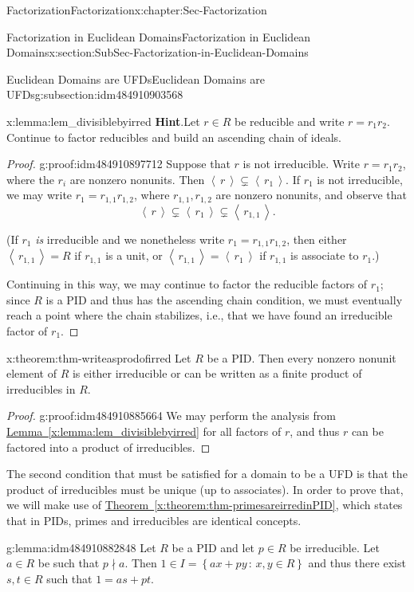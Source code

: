 \documentclass[oneside,10pt,]{book}
\newcommand{\blocktitlefont}{\relax}
\newcommand{\xreffont}{\relax}
\numberwithin{equation}{section}
\newcommand{\ideal}[1]{\left\langle\, #1 \,\right\rangle}
\newcommand{\setof}[2]{{\left\{#1\,\colon\,#2\right\}}}
\begin{document}
\begin{chapterptx}{Factorization}{}{Factorization}{}{}{x:chapter:Sec-Factorization}
\begin{sectionptx}{Factorization in Euclidean Domains}{}{Factorization in Euclidean Domains}{}{}{x:section:SubSec-Factorization-in-Euclidean-Domains}
\begin{subsectionptx}{Euclidean Domains are UFDs}{}{Euclidean Domains are UFDs}{}{}{g:subsection:idm484910903568}
\begin{lemma}{}{}{x:lemma:lem_divisiblebyirred}
\textbf{\blocktitlefont Hint}.\quad{}Let \(r\in R\) be reducible and write \(r = r_1 r_2\). Continue to factor reducibles and build an ascending chain of ideals.%
\end{lemma}
\begin{proof}{}{g:proof:idm484910897712}
Suppose that \(r\) is not irreducible. Write \(r = r_1 r_2\), where the \(r_i\) are nonzero nonunits. Then \(\ideal{r} \subsetneq \ideal{r_1}\). If \(r_1\) is not irreducible, we may write \(r_1 = r_{1,1}r_{1,2}\), where \(r_{1,1},r_{1,2}\) are nonzero nonunits, and observe that%
\begin{equation*}
\ideal{r} \subsetneq \ideal{r_1}\subsetneq \ideal{r_{1,1}}\text{.}
\end{equation*}
%
\par
(If \(r_1\) \emph{is} irreducible and we nonetheless write \(r_1 = r_{1,1} r_{1,2}\), then either \(\ideal{r_{1,1}} = R\) if \(r_{1,1}\) is a unit, or \(\ideal{r_{1,1}} = \ideal{r_1}\) if \(r_{1,1}\) is associate to \(r_1\).)%
\par
Continuing in this way, we may continue to factor the reducible factors of \(r_1\); since \(R\) is a PID and thus has the ascending chain condition, we must eventually reach a point where the chain stabilizes, i.e., that we have found an irreducible factor of \(r_1\).%
\end{proof}
\begin{theorem}{}{}{x:theorem:thm-writeasprodofirred}%
Let \(R\) be a PID. Then every nonzero nonunit element of \(R\) is either irreducible or can be written as a finite product of irreducibles in \(R\).%
\end{theorem}
\begin{proof}{}{g:proof:idm484910885664}
We may perform the analysis from \hyperref[x:lemma:lem_divisiblebyirred]{Lemma~{\xreffont\ref{x:lemma:lem_divisiblebyirred}}} for all factors of \(r\), and thus \(r\) can be factored into a product of irreducibles.%
\end{proof}
The second condition that must be satisfied for a domain to be a UFD is that the product of irreducibles must be unique (up to associates). In order to prove that, we will make use of \hyperref[x:theorem:thm-primesareirredinPID]{Theorem~{\xreffont\ref{x:theorem:thm-primesareirredinPID}}}, which states that in PIDs, primes and irreducibles are identical concepts.%
\begin{lemma}{}{}{g:lemma:idm484910882848}%
Let \(R\) be a PID and let \(p\in R\) be irreducible. Let \(a\in R\) be such that \(p\nmid a\). Then \(1\in I = \setof{ax+py}{x,y\in R}\) and thus there exist \(s,t\in R\) such that \(1 = as+pt\).%

\end{lemma}
\end{subsectionptx}
\end{sectionptx}
\end{chapterptx}
\end{document}
